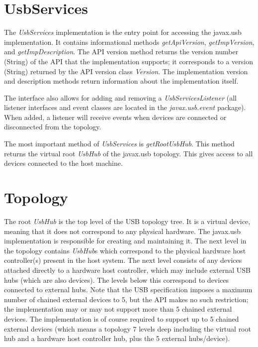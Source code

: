 \documentclass{article}
\newcommand{\myclass}[1]{\emph{#1}}
\newcommand{\myinterface}[1]{\emph{#1}}
\newcommand{\mypackage}[1]{\emph{#1}}
\newcommand{\mymethod}[1]{\emph{#1}}
\begin{document}
%

\section{UsbServices}

The \myinterface{UsbServices} implementation is the entry point for accessing the
javax.usb implementation.  It contains informational methods \mymethod{getApiVersion},
\mymethod{getImpVersion}, and \mymethod{getImpDescription}.  The API version method
returns the version number (String) of the API that the implementation supports; it
corresponds to a version (String) returned by the API version class \myclass{Version}.
The implementation version and description methods return information about the
implementation itself.

The interface also allows for adding and removing a \myinterface{UsbServicesListener}
(all listener interfaces and event classes are located in the \mypackage{javax.usb.event} package).
When added, a listener will receive events when devices are connected or disconnected from the
topology.

The most important method of \myinterface{UsbServices} is \mymethod{getRootUsbHub}.
This method returns the virtual root \myinterface{UsbHub} of the javax.usb topology.  This gives access
to all devices connected to the host machine.

%

\section{Topology}

The root \myinterface{UsbHub} is the top level of the USB topology tree.  It is a
virtual device, meaning that it does not correspond to any physical hardware.
The javax.usb implementation is responsible for creating and maintaining it.
The next level in the topology contains \myinterface{UsbHub}s which correspond to the
physical hardware host controller(s) present in the host system.  The next
level consists of any devices attached directly to a hardware host controller,
which may include external USB hubs (which are also devices).  The levels below
this correspond to devices connected to external hubs.  Note that the USB
specification imposes a maximum number of chained external devices to 5,
but the API makes no such restriction; the implementation may or may not
support more than 5 chained external devices.  The implementation is of course
required to support up to 5 chained external devices (which means a topology
7 levels deep including the virtual root hub and a hardware host controller hub,
plus the 5 external hubs/device).
\end{document}
